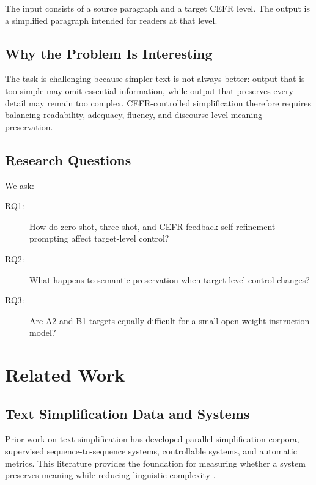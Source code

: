 \documentclass[11pt]{article}
\begin{document}
The input consists of a source paragraph and a target CEFR level. The output is a simplified paragraph intended for readers at that level.

\subsection{Why the Problem Is Interesting}

The task is challenging because simpler text is not always better: output that is too simple may omit essential information, while output that preserves every detail may remain too complex. CEFR-controlled simplification therefore requires balancing readability, adequacy, fluency, and discourse-level meaning preservation.

\subsection{Research Questions}

We ask:

\begin{description}
    \item[RQ1:] How do zero-shot, three-shot, and CEFR-feedback self-refinement prompting affect target-level control?
    \item[RQ2:] What happens to semantic preservation when target-level control changes?
    \item[RQ3:] Are A2 and B1 targets equally difficult for a small open-weight instruction model?
\end{description}

\section{Related Work}

\subsection{Text Simplification Data and Systems}

Prior work on text simplification has developed parallel simplification corpora, supervised sequence-to-sequence systems, controllable systems, and automatic metrics. This literature provides the foundation for measuring whether a system preserves meaning while reducing linguistic complexity \citep{xu-etal-2016-optimizing,alva-manchego-etal-2020-asset}.
\end{document}
